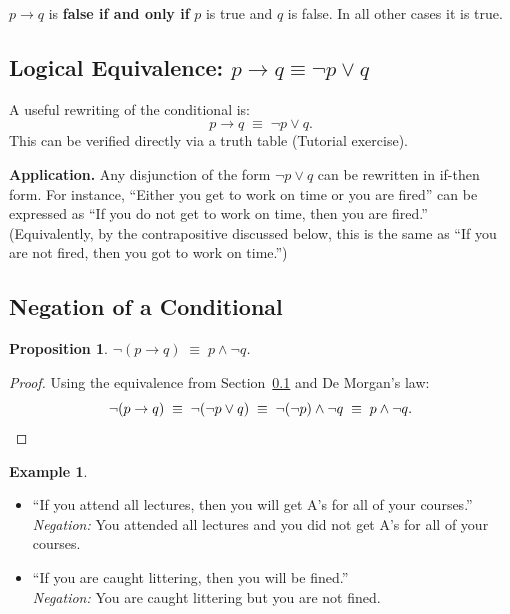 \documentclass[11pt, a4paper, notitlepage]{report}
\newtheorem{proposition}[theorem]{Proposition}
\theoremstyle{definition}
\newtheorem{example}[theorem]{Example}
\theoremstyle{remark}
\begin{document}
\begin{keyresult}[title={Key Result: When is $p \to q$ false?}]
$p \to q$ is \textbf{false if and only if} $p$ is true and $q$ is false. In all other
cases it is true.
\end{keyresult}

\subsection{Logical Equivalence: \texorpdfstring{$p \to q \equiv \lnot p \lor q$}{p implies q}}
\label{subsec:ptoq-equiv}

A useful rewriting of the conditional is:
\[
  p \to q \;\equiv\; \lnot p \lor q.
\]
This can be verified directly via a truth table (Tutorial exercise).

\textbf{Application.} Any disjunction of the form $\lnot p \lor q$ can be rewritten in
if-then form. For instance, ``Either you get to work on time or you are fired'' can be
expressed as ``If you do not get to work on time, then you are fired.'' (Equivalently, by
the contrapositive discussed below, this is the same as ``If you are not fired, then you
got to work on time.'')

\subsection{Negation of a Conditional}

\begin{proposition}
\label{prop:neg-conditional}
$\lnot(p \to q) \;\equiv\; p \land \lnot q$.
\end{proposition}

\begin{proof}
Using the equivalence from Section~\ref{subsec:ptoq-equiv} and De Morgan's law:
\[
  \lnot(p \to q)
  \;\equiv\; \lnot(\lnot p \lor q)
  \;\equiv\; \lnot(\lnot p) \land \lnot q
  \;\equiv\; p \land \lnot q. \qedhere
\]
\end{proof}

\begin{example}
\begin{itemize}[nosep]
  \item ``If you attend all lectures, then you will get A's for all of your courses.''\\
        \textit{Negation:} You attended all lectures and you did not get A's for all of your
        courses.
  \item ``If you are caught littering, then you will be fined.''\\
        \textit{Negation:} You are caught littering but you are not fined.
\end{itemize}
\end{example}
\end{document}
